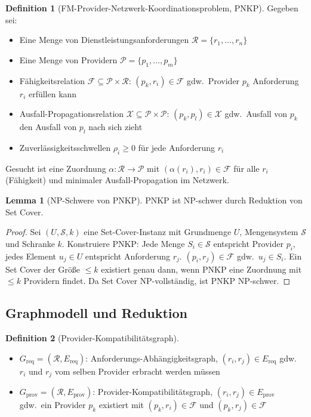 ﻿\documentclass[a4paper,12pt]{article}
\theoremstyle{definition}
\newtheorem{definition}{Definition}[section]
\newtheorem{lemma}{Lemma}[section]
\begin{document}
\begin{definition}[FM-Provider-Netzwerk-Koordinationsproblem, PNKP]
\label{def:pnkp}
Gegeben sei:
\begin{itemize}
    \item Eine Menge von Dienstleistungsanforderungen $\mathcal{R} = \{r_1, \ldots, r_n\}$
    \item Eine Menge von Providern $\mathcal{P} = \{p_1, \ldots, p_m\}$
    \item Fähigkeitsrelation $\mathcal{F} \subseteq \mathcal{P} \times \mathcal{R}$:
          $(p_k, r_i) \in \mathcal{F}$ gdw.\ Provider $p_k$ Anforderung $r_i$ erfüllen kann
    \item Ausfall-Propagationsrelation $\mathcal{X} \subseteq \mathcal{P} \times \mathcal{P}$:
          $(p_k, p_l) \in \mathcal{X}$ gdw.\ Ausfall von $p_k$ den Ausfall von $p_l$ nach sich zieht
    \item Zuverlässigkeitsschwellen $\rho_i \geq 0$ für jede Anforderung $r_i$
\end{itemize}
Gesucht ist eine Zuordnung $\alpha: \mathcal{R} \to \mathcal{P}$ mit
$(\alpha(r_i), r_i) \in \mathcal{F}$ für alle $r_i$ (Fähigkeit) und
minimaler Ausfall-Propagation im Netzwerk.
\end{definition}

\begin{lemma}[NP-Schwere von PNKP]
\label{lem:pnkp-np}
PNKP ist NP-schwer durch Reduktion von Set Cover.
\end{lemma}

\begin{proof}
Sei $(U, \mathcal{S}, k)$ eine Set-Cover-Instanz mit Grundmenge $U$,
Mengensystem $\mathcal{S}$ und Schranke $k$.
Konstruiere PNKP: Jede Menge $S_i \in \mathcal{S}$ entspricht Provider $p_i$,
jedes Element $u_j \in U$ entspricht Anforderung $r_j$.
$(p_i, r_j) \in \mathcal{F}$ gdw.\ $u_j \in S_i$.
Ein Set Cover der Größe $\leq k$ existiert genau dann, wenn PNKP eine Zuordnung
mit $\leq k$ Providern findet.
Da Set Cover NP-vollständig, ist PNKP NP-schwer.
\end{proof}

\subsection{Graphmodell und Reduktion}

\begin{definition}[Provider-Kompatibilitätsgraph]
\label{def:pkg}
\begin{itemize}
    \item $G_{\mathrm{req}} = (\mathcal{R}, E_{\mathrm{req}})$: Anforderungs-Abhängigkeitsgraph,
          $(r_i, r_j) \in E_{\mathrm{req}}$ gdw.\ $r_i$ und $r_j$ vom selben Provider erbracht werden müssen
    \item $G_{\mathrm{prov}} = (\mathcal{R}, E_{\mathrm{prov}})$: Provider-Kompatibilitätsgraph,
          $(r_i, r_j) \in E_{\mathrm{prov}}$ gdw.\ ein Provider $p_k$ existiert mit
          $(p_k, r_i) \in \mathcal{F}$ und $(p_k, r_j) \in \mathcal{F}$
\end{itemize}
\end{definition}
\end{document}
